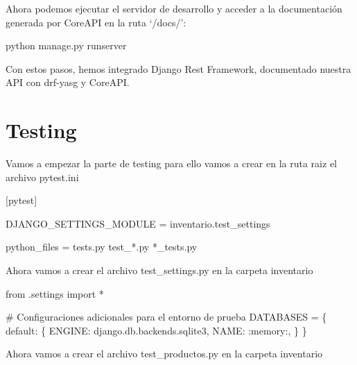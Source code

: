 \documentclass[
  a4paper,
  DIV=11,
  numbers=noendperiod,
  onepage,
  openany]{scrreprt}
\newenvironment{Shaded}{\begin{snugshade}}{\end{snugshade}}
\newcommand{\CommentTok}[1]{\textcolor[rgb]{0.37,0.37,0.37}{#1}}
\newcommand{\DataTypeTok}[1]{\textcolor[rgb]{0.68,0.00,0.00}{#1}}
\newcommand{\ExtensionTok}[1]{\textcolor[rgb]{0.00,0.23,0.31}{#1}}
\newcommand{\ImportTok}[1]{\textcolor[rgb]{0.00,0.46,0.62}{#1}}
\newcommand{\KeywordTok}[1]{\textcolor[rgb]{0.00,0.23,0.31}{#1}}
\newcommand{\NormalTok}[1]{\textcolor[rgb]{0.00,0.23,0.31}{#1}}
\newcommand{\OperatorTok}[1]{\textcolor[rgb]{0.37,0.37,0.37}{#1}}
\newcommand{\OtherTok}[1]{\textcolor[rgb]{0.00,0.23,0.31}{#1}}
\newcommand{\StringTok}[1]{\textcolor[rgb]{0.13,0.47,0.30}{#1}}
\begin{document}
Ahora podemos ejecutar el servidor de desarrollo y acceder a la
documentación generada por CoreAPI en la ruta `/docs/':

\begin{Shaded}
\begin{Highlighting}[]
\ExtensionTok{python}\NormalTok{ manage.py runserver}
\end{Highlighting}
\end{Shaded}

Con estos pasos, hemos integrado Django Rest Framework, documentado
nuestra API con drf-yasg y CoreAPI.

\chapter{Testing}\label{testing-1}

Vamos a empezar la parte de testing para ello vamos a crear en la ruta
raiz el archivo pytest.ini

\begin{Shaded}
\begin{Highlighting}[]
\KeywordTok{[pytest]}

\DataTypeTok{DJANGO\_SETTINGS\_MODULE }\OtherTok{=}\StringTok{ inventario.test\_settings}

\DataTypeTok{python\_files }\OtherTok{=}\StringTok{ tests.py test\_*.py *\_tests.py}
\end{Highlighting}
\end{Shaded}

Ahora vamos a crear el archivo test\_settings.py en la carpeta
inventario

\begin{Shaded}
\begin{Highlighting}[]
\ImportTok{from}\NormalTok{ .settings }\ImportTok{import} \OperatorTok{*}

\CommentTok{\# Configuraciones adicionales para el entorno de prueba}
\NormalTok{DATABASES }\OperatorTok{=}\NormalTok{ \{}
    \StringTok{\textquotesingle{}default\textquotesingle{}}\NormalTok{: \{}
        \StringTok{\textquotesingle{}ENGINE\textquotesingle{}}\NormalTok{: }\StringTok{\textquotesingle{}django.db.backends.sqlite3\textquotesingle{}}\NormalTok{,}
        \StringTok{\textquotesingle{}NAME\textquotesingle{}}\NormalTok{: }\StringTok{\textquotesingle{}:memory:\textquotesingle{}}\NormalTok{,}
\NormalTok{    \}}
\NormalTok{\}}
\end{Highlighting}
\end{Shaded}

Ahora vamos a crear el archivo test\_productos.py en la carpeta
inventario
\end{document}
